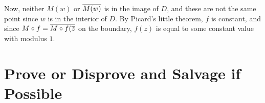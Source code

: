 \documentclass{homework}
\begin{document}
\begin{solution}
                                                                                                                                                                                                                                                                                                                                        Now, neither $M(w)$ or $\overline{M(w)}$ is in the image of $D$, and these are not the same point since $w$ is in the interior of $D$. By Picard's little theorem, $f$ is constant, and since $M\circ f =\overline{M\circ f(\overline{z}}$ on the boundary, $f(z)$ is equal to some constant value with modulus $1$.
                                                                                                                                                                                                                                                                                                                                        \end{solution}
                                                                                                                                                                                                                                                                                                                                        \section{Prove or Disprove and Salvage if Possible}
\end{document}
